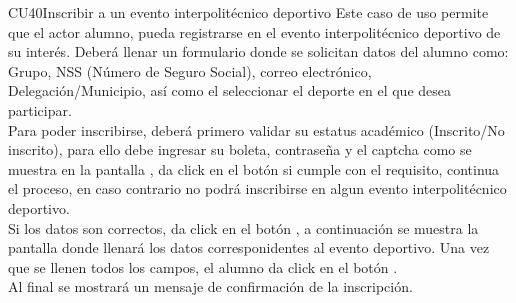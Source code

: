 \begin{UseCase}{CU40}{Inscribir a un evento interpolitécnico deportivo}{
		\noindent Este caso de uso permite que el actor alumno, pueda registrarse en el evento interpolitécnico deportivo de su interés. Deberá llenar un formulario donde se solicitan datos del alumno como: Grupo, NSS (Número de Seguro Social), correo electrónico, Delegación/Municipio, así como el seleccionar el deporte en el que desea participar.\\
		Para poder inscribirse, deberá primero validar su estatus académico (Inscrito/No inscrito), para ello debe ingresar su boleta, contraseña y el captcha como se muestra en la pantalla , da click en el botón  si cumple con el requisito, continua el proceso, en caso contrario no podrá inscribirse en algun evento interpolitécnico deportivo.\\
		Si los datos son correctos, da click en el botón , a continuación se muestra la pantalla  donde llenará los datos corresponidentes al evento deportivo. Una vez que se llenen todos los campos, el alumno da click en el botón .\\ 
		Al final se mostrará un mensaje de confirmación de la inscripción.
	} \label{CU40_Inscribirauneventointerpolitécnicodeportivo}
\end{UseCase}
